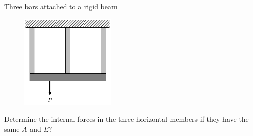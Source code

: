 \documentclass[
10pt,
a4paper,
openany,
svgnames,
]{book} %
\begin{document}
\begin{example} Three bars attached to a rigid beam
  \begin{figure}[H]
    \centering
    \includegraphics[width=0.4\textwidth]{pictures/Axial-load/3-bars-rigid-beam}
  \end{figure}

  Determine the internal forces in the three horizontal members if they have the same $A$ and $E$?
\end{example}
\end{document}
